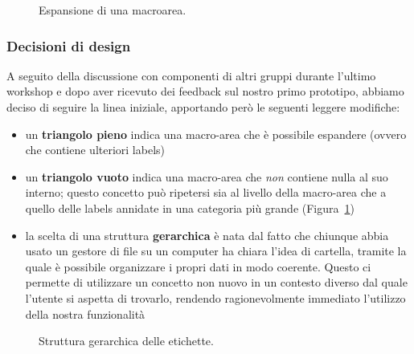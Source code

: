 \documentclass[12pt]{article} %
\begin{document}
\begin{figure}[H]
\caption{Espansione di una macroarea.}
\label{fig:low_prototype}
\end{figure}

\subsubsection{Decisioni di design}
A seguito della discussione con componenti di altri gruppi durante l'ultimo workshop e dopo aver ricevuto dei feedback sul nostro primo prototipo, abbiamo deciso di seguire la linea iniziale, apportando per\`o le seguenti leggere modifiche:
\begin{itemize}
\item un \textbf{triangolo pieno} indica una macro-area che \`e possibile espandere (ovvero che contiene ulteriori labels)
\item un \textbf{triangolo vuoto} indica una macro-area che \emph{non} contiene nulla al suo interno; questo concetto pu\`o ripetersi sia al livello della macro-area che a quello delle labels annidate in una categoria pi\`u grande (Figura~\ref{fig:low_prototype})
\item la scelta di una struttura \textbf{gerarchica} \`e nata dal fatto che chiunque abbia usato un gestore di file su un computer ha chiara l'idea di cartella, tramite la quale \`e possibile organizzare i propri dati in modo coerente. Questo ci permette di utilizzare un concetto non nuovo in un contesto diverso dal quale l'utente si aspetta di trovarlo, rendendo ragionevolmente immediato l'utilizzo della nostra funzionalit\`a
\end{itemize}

\begin{figure}[H]
\caption{Struttura gerarchica delle etichette.}
\label{fig:low_prototype2}
\end{figure}
\end{document}
